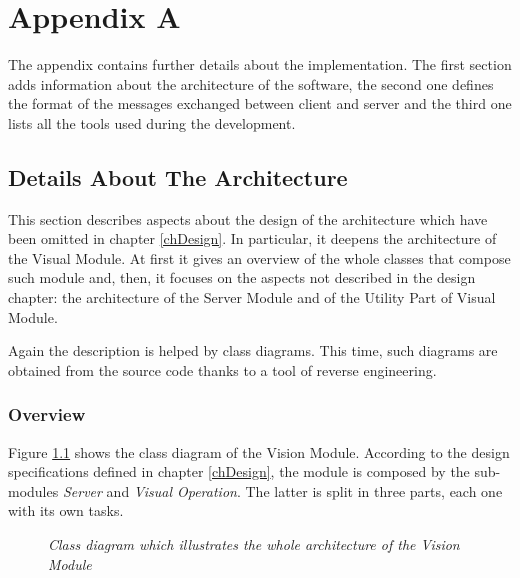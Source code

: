 \chapter{Appendix A}\label{app}
	The appendix contains further details about the implementation.
	The first section adds information about the architecture of the software, the second one defines the format of the messages exchanged between client and server and the third one lists all the tools used during the development.	
			

	\section{Details About The Architecture} \label{appA}
		This section describes aspects about the design of the architecture which have been omitted in chapter \ref{chDesign}.
		In particular, it deepens the architecture of the Visual Module.
		At first it gives an overview of the whole classes that compose such module and, then, it focuses on the aspects not described in the design chapter: the architecture of the Server Module and of the Utility Part of Visual Module.
		
		
		Again the description is helped by class diagrams. 
		This time, such diagrams are obtained from the source code thanks to a tool of reverse engineering.
	
		\subsection{Overview}\label{impl_arch}
		Figure \ref{fig:implementation_names} shows the class diagram of the Vision Module. 
		According to the design specifications defined in chapter \ref{chDesign}, the module is composed by the sub-modules \emph{Server} and \emph{Visual Operation}. 
		The latter is split in three parts, each one with its own tasks.

		\begin{figure}[h]
		  \begin{center} 
		  \end{center} 
		  \caption{\textit{Class diagram which illustrates the whole architecture of the Vision Module}}  
		  \label{fig:implementation_names}
	 	\end{figure}
 
